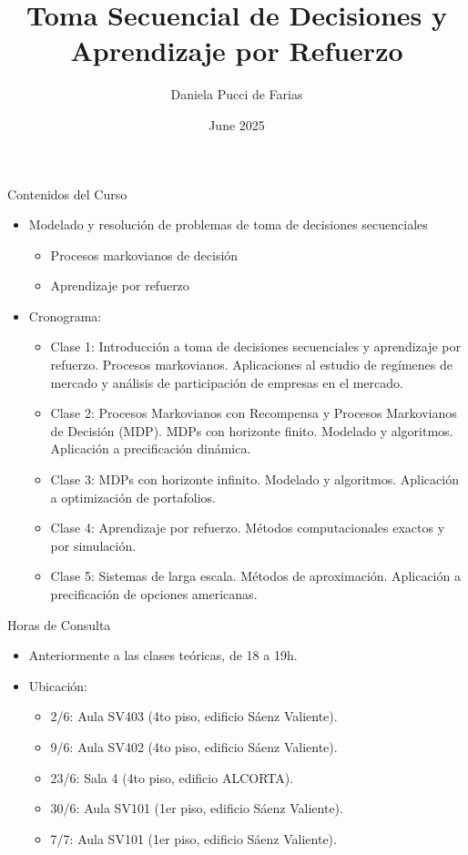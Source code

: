 \documentclass{beamer}
\title{Toma Secuencial de Decisiones \newline y Aprendizaje por Refuerzo}
\author{Daniela Pucci de Farias}
\institute{Universidad Torcuato Di Tella}
\date{June 2025}
\begin{document}
\frame{\titlepage}

\begin{frame}{Contenidos del Curso}
\begin{itemize}
\item Modelado y resolución de problemas de toma de decisiones secuenciales
\begin{itemize}
\item<2-> Procesos markovianos de decisión
\item<2-> Aprendizaje por refuerzo
\end{itemize}
\item<3-> Cronograma:
\begin{itemize}
\item<4-> Clase 1: Introducción a toma de decisiones secuenciales y aprendizaje por refuerzo. Procesos markovianos. Aplicaciones al estudio de regímenes de mercado y análisis de participación de empresas en el mercado.

\item<5-> Clase 2: Procesos Markovianos con Recompensa y Procesos Markovianos de Decisión (MDP). MDPs con horizonte finito. Modelado y algoritmos. Aplicación a precificación dinámica.

\item<6-> Clase 3: MDPs con horizonte infinito. Modelado y algoritmos. Aplicación a optimización de portafolios.

\item<7-> Clase 4: Aprendizaje por refuerzo. Métodos computacionales exactos y por simulación.

\item<8-> Clase 5: Sistemas de larga escala. Métodos de aproximación. Aplicación a precificación de opciones americanas.
\end{itemize}
\end{itemize}   
\end{frame}

\begin{frame}{Horas de Consulta}
\begin{itemize}
\item Anteriormente a las clases teóricas, de 18 a 19h.
\item Ubicación:
\begin{itemize}
\item 2/6: Aula SV403 (4to piso, edificio Sáenz Valiente).
\item 9/6: Aula SV402 (4to piso, edificio Sáenz Valiente).
\item 23/6: Sala 4 (4to piso, edificio ALCORTA).
\item 30/6: Aula SV101 (1er piso, edificio Sáenz Valiente).
\item 7/7: Aula SV101 (1er piso, edificio Sáenz Valiente).
\end{itemize}
\end{itemize}
\end{frame}
\end{document}
